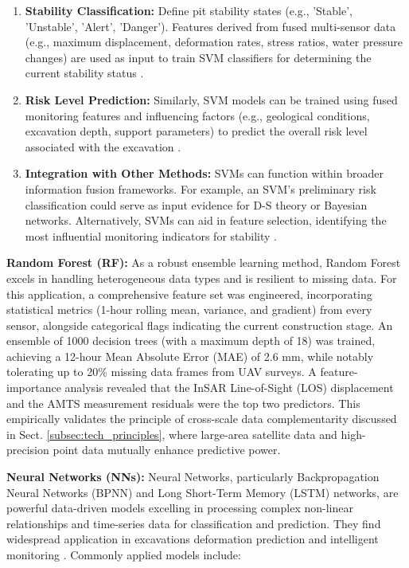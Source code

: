 \documentclass[preprint,11pt,authoryear,3p]{elsarticle}
\begin{document}
\begin{enumerate}
    \item \textbf{Stability Classification:} Define pit stability states (e.g., 'Stable', 'Unstable', 'Alert', 'Danger'). Features derived from fused multi-sensor data (e.g., maximum displacement, deformation rates, stress ratios, water pressure changes) are used as input to train SVM classifiers for determining the current stability status \citep{LI20231019}.

    \item \textbf{Risk Level Prediction:} Similarly, SVM models can be trained using fused monitoring features and influencing factors (e.g., geological conditions, excavation depth, support parameters) to predict the overall risk level associated with the excavation \citep{PAN2024109578}.

    \item \textbf{Integration with Other Methods:} SVMs can function within broader information fusion frameworks. For example, an SVM's preliminary risk classification could serve as input evidence for D-S theory or Bayesian networks. Alternatively, SVMs can aid in feature selection, identifying the most influential monitoring indicators for stability \citep{WU2024105516}.
\end{enumerate}


\textbf{Random Forest (RF):} As a robust ensemble learning method, Random Forest excels in handling heterogeneous data types and is resilient to missing data. For this application, a comprehensive feature set was engineered, incorporating statistical metrics (1-hour rolling mean, variance, and gradient) from every sensor, alongside categorical flags indicating the current construction stage. An ensemble of 1000 decision trees (with a maximum depth of 18) was trained, achieving a 12-hour Mean Absolute Error (MAE) of 2.6 mm, while notably tolerating up to 20\% missing data frames from UAV surveys. A feature-importance analysis revealed that the InSAR Line-of-Sight (LOS) displacement and the AMTS measurement residuals were the top two predictors. This empirically validates the principle of cross-scale data complementarity discussed in Sect. \ref{subsec:tech_principles}, where large-area satellite data and high-precision point data mutually enhance predictive power.

\textbf{Neural Networks (NNs):} Neural Networks, particularly Backpropagation Neural Networks (BPNN) and Long Short-Term Memory (LSTM) networks, are powerful data-driven models excelling in processing complex non-linear relationships and time-series data for classification and prediction. They find widespread application in excavations deformation prediction and intelligent monitoring \citep{WU2023184, YANG2024, XIE2022101313}. Commonly applied models include:
\end{document}
